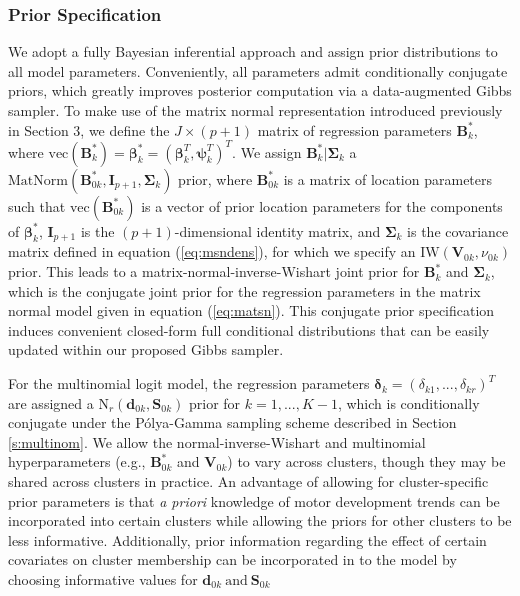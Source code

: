 \documentclass[useAMS,referee]{biom}
\begin{document}
\subsubsection{Prior Specification}
We adopt a fully Bayesian inferential approach and assign prior distributions to all model parameters. Conveniently, all parameters admit conditionally conjugate priors, which greatly improves posterior computation via a data-augmented Gibbs sampler. To make use of the matrix normal representation introduced previously in Section 3, we define the $J \times (p+1)$ matrix of regression parameters $\mathbf{B}^*_k$, where $\text{vec}(\mathbf{B}^*_k) = \boldsymbol\beta^*_k = (\boldsymbol\beta_k^T,\boldsymbol\psi_k^T)^T$. We assign $\mathbf{B}^*_k|\boldsymbol\Sigma_k$ a $\text{MatNorm}(\mathbf{B}^*_{0k},\mathbf{I}_{p+1},\boldsymbol\Sigma_k)$ prior, where $\mathbf{B}^*_{0k}$ is a matrix of location parameters such that $\text{vec}(\mathbf{B}^*_{0k})$ is a vector of prior location parameters for the components of $\boldsymbol\beta^*_k$, $\mathbf{I}_{p+1}$ is the $(p+1)$-dimensional identity matrix, and $\boldsymbol\Sigma_k$ is the covariance matrix defined in equation (\ref{eq:msndens}), for which we specify an $\text{IW}(\mathbf{V}_{0k},\nu_{0k})$ prior. This leads to a matrix-normal-inverse-Wishart joint prior for $\mathbf{B}^*_k$ and $\boldsymbol\Sigma_k$, which is the conjugate joint prior for the regression parameters in the matrix normal model given in equation (\ref{eq:matsn}). This conjugate prior specification induces convenient closed-form full conditional distributions that can be easily updated within our proposed Gibbs sampler. 

For the multinomial logit model, the regression parameters $\boldsymbol\delta_k = (\delta_{k1},...,\delta_{kr})^T$ are assigned a $\text{N}_r(\mathbf{d}_{0k}, \mathbf{S}_{0k})$ prior for $k = 1,...,K-1$, which is conditionally conjugate under the P\'olya-Gamma sampling scheme described in Section \ref{s:multinom}. We allow the normal-inverse-Wishart and multinomial hyperparameters (e.g., $\mathbf{B}^*_{0k}$ and $\mathbf{V}_{0k}$) to vary across clusters, though they may be shared across clusters in practice. An advantage of allowing for cluster-specific prior parameters is that \textit{a priori} knowledge of motor development trends can be incorporated into certain clusters while allowing the priors for other clusters to be less informative. Additionally, prior information regarding the effect of certain covariates on cluster membership can be incorporated in to the model by choosing informative values for $\mathbf{d}_{0k} \ \text{and} \ \mathbf{S}_{0k}$
\end{document}
